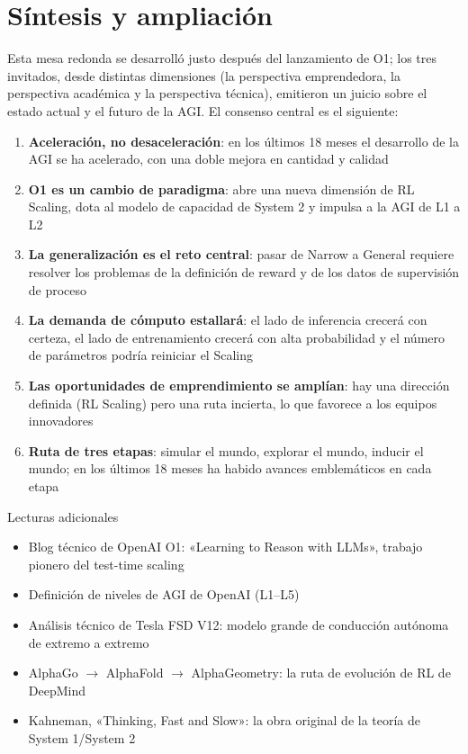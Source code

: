 \section{Síntesis y ampliación}

Esta mesa redonda se desarrolló justo después del lanzamiento de O1; los tres invitados, desde distintas dimensiones (la perspectiva emprendedora, la perspectiva académica y la perspectiva técnica), emitieron un juicio sobre el estado actual y el futuro de la AGI. El consenso central es el siguiente:

\begin{enumerate}
\item \textbf{Aceleración, no desaceleración}: en los últimos 18 meses el desarrollo de la AGI se ha acelerado, con una doble mejora en cantidad y calidad
\item \textbf{O1 es un cambio de paradigma}: abre una nueva dimensión de RL Scaling, dota al modelo de capacidad de System 2 y impulsa a la AGI de L1 a L2
\item \textbf{La generalización es el reto central}: pasar de Narrow a General requiere resolver los problemas de la definición de reward y de los datos de supervisión de proceso
\item \textbf{La demanda de cómputo estallará}: el lado de inferencia crecerá con certeza, el lado de entrenamiento crecerá con alta probabilidad y el número de parámetros podría reiniciar el Scaling
\item \textbf{Las oportunidades de emprendimiento se amplían}: hay una dirección definida (RL Scaling) pero una ruta incierta, lo que favorece a los equipos innovadores
\item \textbf{Ruta de tres etapas}: simular el mundo, explorar el mundo, inducir el mundo; en los últimos 18 meses ha habido avances emblemáticos en cada etapa
\end{enumerate}

\begin{knowledgebox}{Lecturas adicionales}
\begin{itemize}
\item Blog técnico de OpenAI O1: «Learning to Reason with LLMs», trabajo pionero del test-time scaling
\item Definición de niveles de AGI de OpenAI (L1--L5)
\item Análisis técnico de Tesla FSD V12: modelo grande de conducción autónoma de extremo a extremo
\item AlphaGo $\rightarrow$ AlphaFold $\rightarrow$ AlphaGeometry: la ruta de evolución de RL de DeepMind
\item Kahneman, «Thinking, Fast and Slow»: la obra original de la teoría de System 1/System 2
\end{itemize}
\end{knowledgebox}



